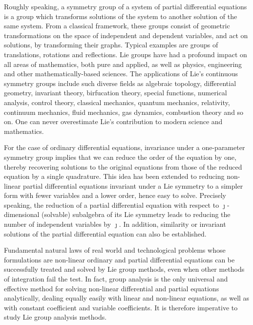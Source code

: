Roughly speaking, a symmetry group of a system of partial differential equations is a group which transforms solutions of the system to another solution of the same system. From  a classical framework, these groups consist of geometric transformations on the space of independent and dependent variables, and act on solutions, by transforming their graphs. Typical examples are groups of translations, rotations and reflections.\citep{olver2000applications}
Lie groups have had a profound impact on all areas of mathematics, both pure and applied, as well as physics, engineering and other mathematically-based sciences. The applications of Lie's continuous symmetry groups include such diverse fields as algebraic topology, differential geometry, invariant theory, birfucation theory, special functions, numerical analysis, control theory, classical mechanics, quantum mechanics, relativity, continuum mechanics, fluid mechanics, gas dynamics, combustion theory and so on. One can never overestimate Lie's contribution to modern science and mathematics.\citep{olver2000applications}

For the case of ordinary differential equations, invariance under a one-parameter symmetry group implies that we can reduce the order of the equation by one, thereby recovering solutions to the original equations from those of the reduced equation by a single quadrature. This idea has been extended to reducing non-linear partial differential equations invariant under a Lie symmetry to a simpler form with fewer variables and a lower order, hence easy to solve. Precisely speaking, the reduction of a partial differential equation with respect to $\jmath$-dimensional (solvable) subalgebra of its Lie symmetry leads to reducing the number of independent variables by $\jmath$. In addition, similarity or invariant solutions of the partial differential equation can also be established.

Fundamental natural laws of real world and technological problems whose formulations are non-linear ordinary and partial differential equations can be successfully treated and solved by Lie group methods, even when other methods of integration  fail the test. In fact, group analysis is the only universal and effective method for solving non-linear differential and partial equations analytically, dealing equally easily with linear and non-linear equations, as well as with constant coefficient and variable coefficients. It is therefore imperative to study Lie group analysis methods.


